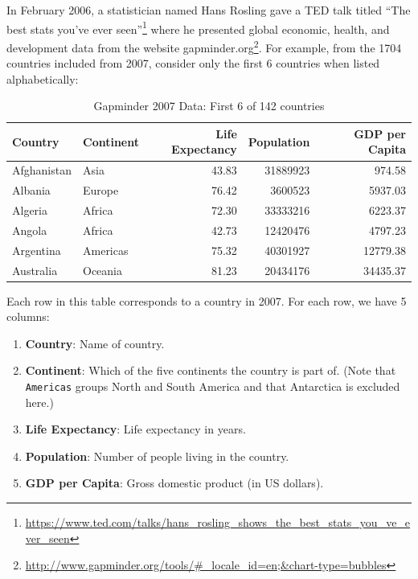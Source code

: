 \documentclass[12pt,]{krantz}
\providecommand{\tightlist}{%
  \setlength{\itemsep}{0pt}\setlength{\parskip}{0pt}}
\renewcommand{\href}[2]{#2\footnote{\url{#1}}}
\theoremstyle{definition}
\theoremstyle{definition}
\theoremstyle{definition}
\theoremstyle{remark}
\begin{document}
In February 2006, a statistician named Hans Rosling gave a TED talk
titled
\href{https://www.ted.com/talks/hans_rosling_shows_the_best_stats_you_ve_ever_seen}{``The
best stats you've ever seen''} where he presented global economic,
health, and development data from the website
\href{http://www.gapminder.org/tools/\#_locale_id=en;\&chart-type=bubbles}{gapminder.org}.
For example, from the 1704 countries included from 2007, consider only
the first 6 countries when listed alphabetically:

\begin{table}[H]

\caption{\label{tab:unnamed-chunk-16}Gapminder 2007 Data: First 6 of 142 countries}
\centering
\fontsize{10}{12}\selectfont
\begin{tabular}[t]{llrrr}
\toprule
Country & Continent & Life Expectancy & Population & GDP per Capita\\
\midrule
Afghanistan & Asia & 43.83 & 31889923 & 974.58\\
Albania & Europe & 76.42 & 3600523 & 5937.03\\
Algeria & Africa & 72.30 & 33333216 & 6223.37\\
Angola & Africa & 42.73 & 12420476 & 4797.23\\
Argentina & Americas & 75.32 & 40301927 & 12779.38\\
Australia & Oceania & 81.23 & 20434176 & 34435.37\\
\bottomrule
\end{tabular}
\end{table}

Each row in this table corresponds to a country in 2007. For each row,
we have 5 columns:

\begin{enumerate}
\def\labelenumi{\arabic{enumi}.}
\tightlist
\item
  \textbf{Country}: Name of country.
\item
  \textbf{Continent}: Which of the five continents the country is part
  of. (Note that \texttt{Americas} groups North and South America and
  that Antarctica is excluded here.)
\item
  \textbf{Life Expectancy}: Life expectancy in years.
\item
  \textbf{Population}: Number of people living in the country.
\item
  \textbf{GDP per Capita}: Gross domestic product (in US dollars).
\end{enumerate}
\end{document}
